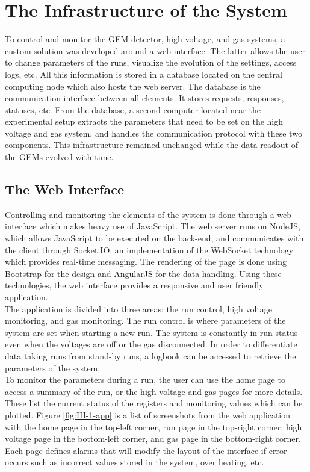   \section{The Infrastructure of the System}

    To control and monitor the GEM detector, high voltage, and gas systems, a custom solution was developed around a web interface. The latter allows the user to change parameters of the runs, visualize the evolution of the settings, access logs, etc. All this information is stored in a database located on the central computing node which also hosts the web server. The database is the communication interface between all elements. It stores requests, responses, statuses, etc. From the database, a second computer located near the experimental setup extracts the parameters that need to be set on the high voltage and gas system, and handles the communication protocol with these two components. This infrastructure remained unchanged while the data readout of the GEMs evolved with time.

    \subsection{The Web Interface}

      Controlling and monitoring the elements of the system is done through a web interface which makes heavy use of JavaScript. The web server runs on NodeJS, which allows JavaScript to be executed on the back-end, and communicates with the client through Socket.IO, an implementation of the WebSocket technology which provides real-time messaging. The rendering of the page is done using Bootstrap for the design and AngularJS for the data handling. Using these technologies, the web interface provides a responsive and user friendly application. \\

      The application is divided into three areas: the run control, high voltage monitoring, and gas monitoring. The run control is where parameters of the system are set when starting a new run. The system is constantly in run status even when the voltages are off or the gas disconnected. In order to differentiate data taking runs from stand-by runs, a logbook can be accessed to retrieve the parameters of the system. \\

      To monitor the parameters during a run, the user can use the home page to access a summary of the run, or the high voltage and gas pages for more details. These list the current status of the registers and monitoring values which can be plotted. Figure \ref{fig:III-1-app} is a list of screenshots from the web application with the home page in the top-left corner, run page in the top-right corner, high voltage page in the bottom-left corner, and gas page in the bottom-right corner. Each page defines alarms that will modify the layout of the interface if error occurs such as incorrect values stored in the system, over heating, etc. \\

